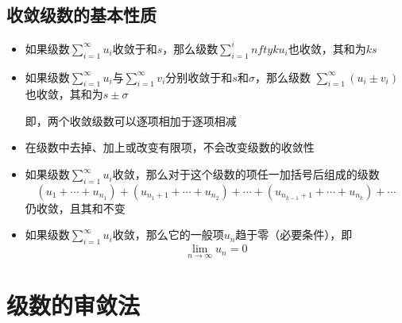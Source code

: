 \documentclass[UTF8]{ctexart}
\newcommand{\emplin}{\vspace{1em}}
\begin{document}
\subsection*{收敛级数的基本性质}
\begin{itemize}
  \item 如果级数$\displaystyle\sum_{i=1}^\infty u_i$收敛于和$s$，那么级数$\displaystyle\sum_{i=1}^infty ku_i$也收敛，其和为$ks$
  \item 如果级数$\displaystyle\sum_{i=1}^\infty u_i$与$\displaystyle\sum_{i=1}^\infty v_i$分别收敛于和$s$和$\sigma$，那么级数
  $\displaystyle\sum_{i=1}^\infty (u_i\pm v_i)$也收敛，其和为$s\pm\sigma$

  即，两个收敛级数可以逐项相加于逐项相减
  \item 在级数中去掉、加上或改变有限项，不会改变级数的收敛性
  \item 如果级数$\displaystyle\sum_{i=1}^\infty u_i$收敛，那么对于这个级数的项任一加括号后组成的级数
  \[(u_1+\cdots+u_{n_1})+(u_{n_1+1}+\cdots+u_{n_2})+\cdots+(u_{n_{k-1}+1}+\cdots+u_{n_k})+\cdots\]
  仍收敛，且其和不变
  \item 如果级数$\displaystyle\sum_{i=1}^\infty u_i$收敛，那么它的一般项$u_n$趋于零（必要条件），即
  \[\lim_{n\to\infty}u_n=0\]
\end{itemize}

\emplin

\section*{级数的审敛法}
\end{document}
